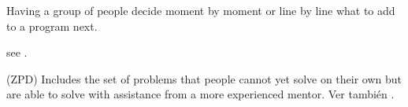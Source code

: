 \begin{description}
 Having a group of people decide moment
by moment or line by line what to add to a program next.

 see .

 (ZPD) Includes the set of problems that
people cannot yet solve on their own but are able to solve with assistance from
a more experienced mentor.  Ver también .

\end{description}
